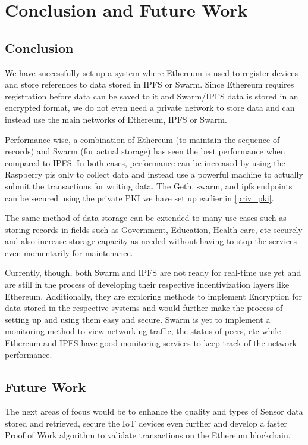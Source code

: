 \documentclass[11pt,openright]{report}
\begin{document}
\chapter{Conclusion and Future Work} \label{chapter:conclusion}
\section{Conclusion}
We have successfully set up a system where Ethereum is used to register devices and store references to data stored in IPFS or Swarm. Since Ethereum requires registration before data can be saved to it and Swarm/IPFS data is stored in an encrypted format, we do not even need a private network to store data and can instead use the main networks of Ethereum, IPFS or Swarm.

Performance wise, a combination of Ethereum (to maintain the sequence of records) and Swarm (for actual storage) has seen the best performance when compared to IPFS. In both cases, performance can be increased by using the Raspberry pis only to collect data and instead use a powerful machine to actually submit the transactions for writing data. The Geth, swarm, and ipfs endpoints can be secured using the private PKI we have set up earlier in \ref{priv_pki}.

The same method of data storage can be extended to many use-cases such as storing records in fields such as Government, Education, Health care, etc securely and also increase storage capacity as needed without having to stop the services even momentarily for maintenance.

Currently, though, both Swarm and IPFS are not ready for real-time use yet and are still in the process of developing their respective incentivization layers \cite{ethersphere2016sw3} like Ethereum. Additionally, they are exploring methods to implement Encryption for data stored in the respective systems and would further make the process of setting up and using them easy and secure. Swarm is yet to implement a monitoring method to view networking traffic, the status of peers, etc while Ethereum and IPFS have good monitoring services to keep track of the network performance.

\section{Future Work}
The next areas of focus would be to enhance the quality and types of Sensor data stored and retrieved, secure the IoT devices even further and develop a faster Proof of Work algorithm to validate transactions on the Ethereum blockchain. 
\end{document}
